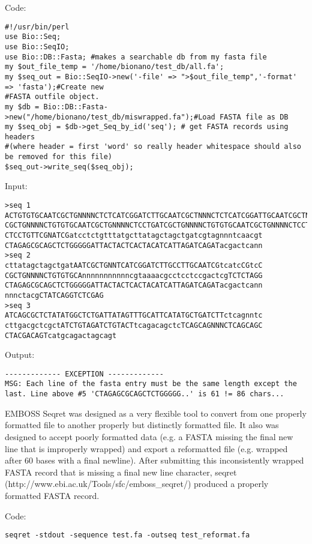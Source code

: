 Code:
\begin{verbatim}
#!/usr/bin/perl
use Bio::Seq;
use Bio::SeqIO;
use Bio::DB::Fasta; #makes a searchable db from my fasta file
my $out_file_temp = '/home/bionano/test_db/all.fa';
my $seq_out = Bio::SeqIO->new('-file' => ">$out_file_temp",'-format' => 'fasta');#Create new 
#FASTA outfile object.
my $db = Bio::DB::Fasta->new("/home/bionano/test_db/miswrapped.fa");#Load FASTA file as DB
my $seq_obj = $db->get_Seq_by_id('seq'); # get FASTA records using headers 
#(where header = first 'word' so really header whitespace should also be removed for this file)
$seq_out->write_seq($seq_obj);
\end{verbatim}

Input: 
\begin{verbatim}
>seq 1
ACTGTGTGCAATCGCTGNNNNCTCTCATCGGATCTTGCAATCGCTNNNCTCTCATCGGATTGCAATCGCTNNNCTtcatcCGGAT
CGCTGNNNNCTGTGTGCAATCGCTGNNNNCTCCTGATCGCTGNNNNCTGTGTGCAATCGCTGNNNNCTCCTGCAATCGCTGNNNN
CTCCTGTTCGNATCGatcctctgtttatgcttatagctagctgatcgtagnnntcaacgt
CTAGAGCGCAGCTCTGGGGGATTACTACTCACTACATCATTAGATCAGATacgactcann
>seq 2
cttatagctagctgatAATCGCTGNNTCATCGGATCTTGCCTTGCAATCGtcatcCGtcC
CGCTGNNNNCTGTGTGCAnnnnnnnnnnncgtaaaacgcctcctccgactcgTCTCTAGG
CTAGAGCGCAGCTCTGGGGGATTACTACTCACTACATCATTAGATCAGATacgactcann
nnnctacgCTATCAGGTCTCGAG
>seq 3
ATCAGCGCTCTATATGGCTCTGATTATAGTTTGCATTCATATGCTGATCTTctcagnntc
cttgacgctcgctATCTGTAGATCTGTACTtcagacagctcTCAGCAGNNNCTCAGCAGC
CTACGACAGTcatgcagactagcagt
\end{verbatim}

Output:
\begin{verbatim}
------------- EXCEPTION -------------
MSG: Each line of the fasta entry must be the same length except the last. Line above #5 'CTAGAGCGCAGCTCTGGGGG..' is 61 != 86 chars...
\end{verbatim}

EMBOSS Seqret was designed as a very flexible tool to convert from one properly formatted file to another properly but distinctly formatted file. It also was designed to accept poorly formatted data (e.g. a FASTA missing the final new line that is improperly wrapped) and export a reformatted file (e.g. wrapped after 60 bases with a final newline). After submitting this inconsistently wrapped FASTA record that is missing a final new line character, seqret (http://www.ebi.ac.uk/Tools/sfc/emboss\_seqret/) produced a properly formatted FASTA record.

Code:

\begin{verbatim}
seqret -stdout -sequence test.fa -outseq test_reformat.fa
\end{verbatim}

